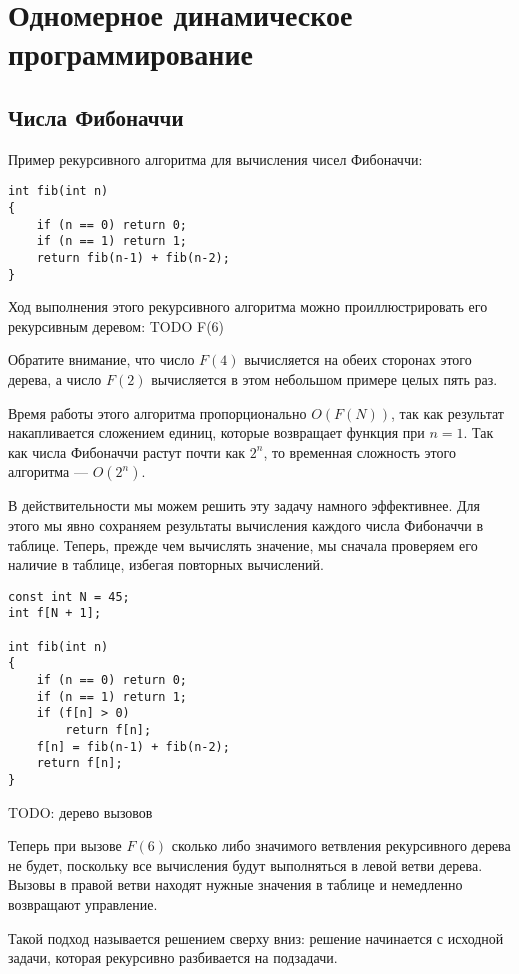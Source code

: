 \documentclass[14pt]{book}
\begin{document}
\section{Одномерное динамическое программирование}

\subsection{Числа Фибоначчи}

Пример рекурсивного алгоритма для вычисления чисел Фибоначчи:

\begin{lstlisting}
int fib(int n)
{
    if (n == 0) return 0;
    if (n == 1) return 1;
    return fib(n-1) + fib(n-2);
}
\end{lstlisting}

Ход выполнения этого рекурсивного алгоритма можно проиллюстрировать его рекурсивным
деревом: TODO F(6)

Обратите внимание, что число $F(4)$ вычисляется на обеих сторонах этого дерева, а число
$F(2)$ вычисляется в этом небольшом примере целых пять раз.

Время работы этого алгоритма пропорционально $O(F(N))$, так как результат накапливается
сложением единиц, которые возвращает функция при $n=1$. Так как числа Фибоначчи растут почти
как $2^n$, то временная сложность этого алгоритма --- $O(2^n)$.

В действительности мы можем решить эту задачу намного эффективнее. Для этого мы явно сохраняем
результаты вычисления каждого числа Фибоначчи в таблице. Теперь, прежде чем вычислять
значение, мы сначала проверяем его наличие в таблице, избегая повторных вычислений.

\begin{lstlisting}
const int N = 45;
int f[N + 1];

int fib(int n)
{
    if (n == 0) return 0;
    if (n == 1) return 1;
    if (f[n] > 0)
        return f[n];
    f[n] = fib(n-1) + fib(n-2);
    return f[n];
}
\end{lstlisting}

TODO: дерево вызовов

Теперь при вызове $F(6)$ сколько либо значимого ветвления рекурсивного дерева не будет,
поскольку все вычисления будут выполняться в левой ветви дерева. Вызовы в правой ветви
находят нужные значения в таблице и немедленно возвращают управление.

Такой подход называется решением сверху вниз: решение начинается с исходной задачи, которая 
рекурсивно разбивается на подзадачи.
\end{document}

